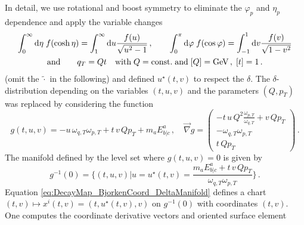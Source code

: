 In detail, we use rotational and boost symmetry to eliminate the $\varphi_p$ and $\eta_p$ dependence and apply the variable changes
\begin{gather*}
    \int_0^\infty\text{d}\eta\;f(\cosh\eta)=\int_1^\infty\text{d} u\frac{f(u)}{\sqrt{u^2-1}}\,,\qquad \int_0^\pi\text{d}\varphi\;f(\cos\varphi)=\int_{-1}^1\text{d} v\frac{f(v)}{\sqrt{1-v^2}}\\
   \text{and}\qquad q_T=Q t\quad\text{with}\;Q={\text{const.}}\;\text{and}\;[Q]=\text{GeV}\,,\;[t]=1\,.
\end{gather*}
(omit the $\tilde{\cdot}$ in the following) and defined $u^\star(t,v)$ to respect the $\delta$. The $\delta$-distribution depending on the variables ${(t,u,v)}$ and the parameters ${(Q,p_T)}$ was replaced by considering the function
\begin{equation}
    g(t,u,v)=-u\,\omega_{q,T} \omega_{p,T} +t\,v\,Qp_T+m_a E^a_{b\vert c}\,,\quad
        \vec{\nabla} g=
        \begin{pmatrix}
            -t\,u\,Q^2\frac{\omega_{p,T}}{\omega_{q,T}}+v\,Q p_T\\
            -\omega_{q,T}\omega_{p,T}\\
            t\,Q p_T
        \end{pmatrix}\,.
\end{equation}
The manifold defined by the level set where ${g(t,u,v)=0}$ is given by 
\begin{equation}
    g^{-1}(0)=\Bigg\{(t,u,v)\Big\vert u=u^\star(t,v)=\frac{m_a E^a_{b\vert c}+t\,v\,Q p_T}{\omega_{q,T}\omega_{p,T}}\Bigg\}\,.
    \label{eq:DecayMap_BjorkenCoord_DeltaManifold}
\end{equation}
Equation \eqref{eq:DecayMap_BjorkenCoord_DeltaManifold} defines a chart $(t,v)\mapsto x^i(t,v)=(t,u^\star(t,v),v)$ on $g^{-1}(0)$ with coordinates $(t,v)$. One computes the coordinate derivative vectors and oriented surface element
